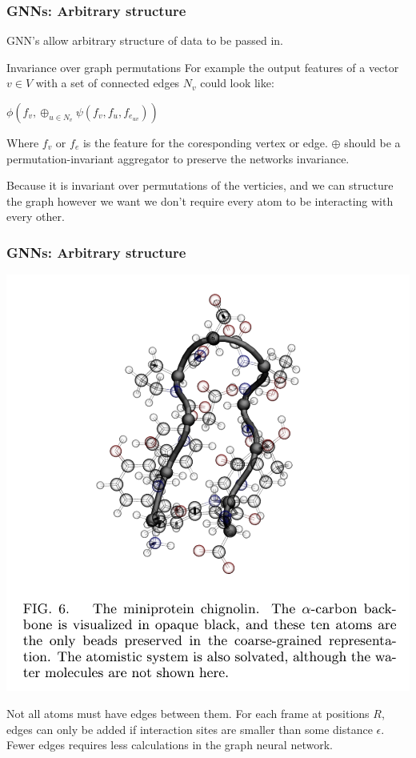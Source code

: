 \documentclass{beamer}
\begin{document}
\begin{frame}
  \frametitle{GNNs: Arbitrary structure}
  GNN's allow arbitrary structure of data to be passed in.
  \begin{block}{Invariance over graph permutations}
    For example the output features of a vector $v \in V$ with a set of connected edges $N_v$ could look like:
    \begin{center}
      $\phi(f_v, \oplus_{u \in N_v}\psi(f_v, f_u, f_{e_{uv}}))$
    \end{center}
    Where $f_v$ or $f_e$ is the feature for the coresponding vertex or edge. $\oplus$ should be a permutation-invariant aggregator to preserve the networks invariance.
  \end{block}
  Because it is invariant over permutations of the verticies, and we can structure the graph however we want we don't require every atom to be interacting with every other.
\end{frame}
\begin{frame}
  \frametitle{GNNs: Arbitrary structure}
  \begin{minipage}{6cm}
    \includegraphics[width=\linewidth]{./coarse_graining2.png}
  \end{minipage}%
  \begin{minipage}{6cm}
    Not all atoms must have edges between them. For each frame at positions $R$, edges can only be added if interaction sites are smaller than some distance $\epsilon$. Fewer edges requires less calculations in the graph neural network.
  \end{minipage}
\end{frame}
\end{document}
